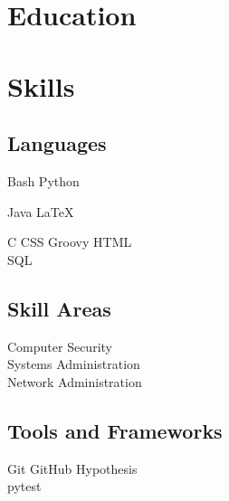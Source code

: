 \documentclass[]{deedy-resume-openfont}
\begin{document}
%
%

%
%

\begin{minipage}[t]{0.35\textwidth} 


\section{Education} 
\sectionsep


\section{Skills}

\subsection{Languages}

Bash \textbullet{} Python

Java \textbullet{} \LaTeX\ 

C \textbullet{} CSS \textbullet{} Groovy \textbullet{} HTML \\
SQL
\sectionsep

\subsection{Skill Areas}

Computer Security \\
Systems Administration \\
Network Administration
\sectionsep

\subsection{Tools and Frameworks}
Git \textbullet{} GitHub \textbullet{} Hypothesis \\
pytest


\end{minipage}
\end{document}

